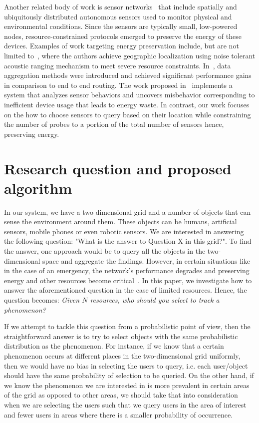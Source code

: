\documentclass{acm_proc_article-sp}
\begin{document}
Another related body of work is sensor networks~\cite{akyildiz2002survey} that include spatially and ubiquitously distributed autonomous sensors used to monitor physical and environmental conditions. Since the sensors are typically small, low-powered nodes, resource-constrained protocols emerged to preserve the energy of these devices. Examples of work targeting energy preservation include, but are not limited to~\cite{sallai2004acoustic}, where the authors achieve geographic localization using noise tolerant acoustic ranging mechanism to meet severe resource constraints. In~\cite{krishnamachari2002impact}, data aggregation methods were introduced and achieved significant performance gains in comparison to end to end routing. The work proposed in~\cite{fontugne2013strip} implements a system that analyzes sensor behaviors and uncovers misbehavior corresponding to inefficient device usage that leads to energy waste. In contrast, our work focuses on the how to choose sensors to query based on their location while constraining the number of probes to a portion of the total number of sensors hence, preserving energy.



\section{Research question and proposed algorithm}
In our system, we have a two-dimensional grid and a number of objects that can sense the environment around them. These objects can be humans, artificial sensors, mobile phones or even robotic sensors. We are interested in answering the following question: "What is the answer to Question X in this grid?". To find the answer, one approach would be to query all the objects in the two-dimensional space and aggregate the findings. However, in certain situations like in the case of an emergency, the network's performance degrades and preserving energy and other resources become critical~\cite{manoj2007communication}. In this paper, we investigate how to answer the aforementioned question in the case of limited resources. Hence, the question becomes: \textit{Given $N$ resources, who should you select to track a phenomenon?}\par


If we attempt to tackle this question from a probabilistic point of view, then the straightforward answer is to try to select objects with the same probabilistic distribution as the phenomenon. For instance, if we know that a certain phenomenon occurs at different places in the two-dimensional grid uniformly, then we would have no bias in selecting the users to query, i.e. each user/object should have the same probability of selection to be queried. On the other hand, if we know the phenomenon we are interested in is more prevalent in certain areas of the grid as opposed to other areas, we should take that into consideration when we are selecting the users such that we query users in the area of interest and fewer users in areas where there is a smaller probability of occurrence.\par
\end{document}

